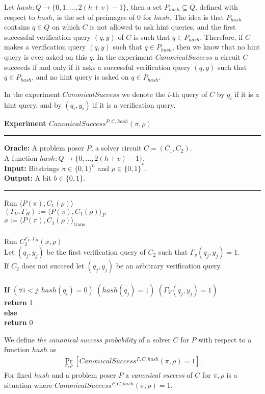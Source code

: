 
Let $hash:Q\rightarrow\{0,1,\dots, 2(h+v)-1\}$, then a set $P_{hash} \subseteq Q$,
defined with respect to $hash$, is the set of preimages of $0$ for $hash$.
The idea is that $P_{hash}$ contains $q \in Q$ on which $C$ is not allowed to ask hint queries,
and the first successful verification query $(q,y)$ of $C$ is such that $q \in P_{hash}$.
Therefore, if $C$ makes a verification query $(q,y)$ such that $q \in P_{hash}$, then we know that no hint query is ever asked on this $q$.
In the experiment $CanonicalSuccess$ a circuit $C$ succeeds if and only if it asks a successful verification query $(q,y)$ such that $q \in P_{hash}$,
and no hint query is asked on $q \in P_{hash}$.

In the experiment $CanonicalSuccess$ we denote the $i$-th query of $C$ by $q_i$ if it is a hint query, and by $(q_i, y_i)$
if it is a verification query.
%
\begin{codeblock}
  \textbf{Experiment $CanonicalSuccess^{P, C, hash}(\pi, \rho)$}
  \medskip

  \hrule

  \medskip
  \textbf{Oracle:} A problem poser $P$, a solver circuit $C = (C_1, C_2)$.\\
  \IndII A function $hash: Q \rightarrow \{0, \dots, 2(h+v) - 1\}$.\\
  \textbf{Input:}  Bitstrings $\pi \in \{0,1\}^n$ and $\rho \in \{0,1\}^*$. \\
  \textbf{Output:} A bit $b \in \{0,1\}$.

  \medskip\hrule\medskip
  Run $\langle P(\pi), C_1(\rho) \rangle$ \\
  \IndI $(\Gamma_V, \Gamma_H) := \langle P(\pi), C_1(\rho) \rangle_{P}$ \\
  \IndI $x := \langle P(\pi), C_1(\rho) \rangle_{\text{trans}}$ \\ \\
  Run $C_2^{\Gamma_V, \Gamma_H} (x, \rho)$ \\
  \IndI Let $(q_j,y_j)$ be the first verification query of $C_2$ such that $\Gamma_v(q_j, y_j) = 1$.\\
  \IndI If $C_2$ does not succeed let $(q_j, y_j)$ be an arbitrary verification query.\\
  \\
  \textbf{If} $(\forall i < j :  hash(q_i) = 0)$ \And $(hash(q_j) = 1)$ \And $(\Gamma_V(q_j, y_j) = 1)$ \then \\
  \IndI \textbf{return} 1\\
  \textbf{else}\\
  \IndI \textbf{return} 0
\end{codeblock}
%
We define \textit{the canonical success probability} of a solver $C$ for $P$ with respect to a function $hash$ as
\begin{align}
 \underset{\pi, \rho}{\Pr}[CanonicalSuccess^{P, C, hash}(\pi, \rho) = 1].
\end{align}
%
For fixed $hash$ and a problem poser $P$ a \textit{canonical success} of $C$ for $\pi, \rho$ is a situation where $CanonicalSuccess^{P, C, hash}(\pi, \rho) = 1$.


